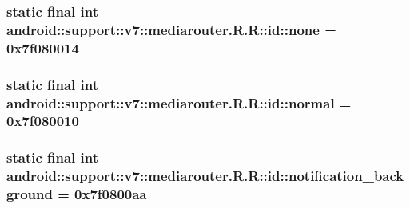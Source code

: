 \hypertarget{classandroid_1_1support_1_1v7_1_1mediarouter_1_1_r_1_1id_33740e6bf35598602d596823b53f16cf}{
\subsubsection[{none}]{\setlength{\rightskip}{0pt plus 5cm}static final int android::support::v7::mediarouter.R.R::id::none = 0x7f080014}}
\label{classandroid_1_1support_1_1v7_1_1mediarouter_1_1_r_1_1id_33740e6bf35598602d596823b53f16cf}


\hypertarget{classandroid_1_1support_1_1v7_1_1mediarouter_1_1_r_1_1id_6d53580addf511d547773e6c3be0c3aa}{
\subsubsection[{normal}]{\setlength{\rightskip}{0pt plus 5cm}static final int android::support::v7::mediarouter.R.R::id::normal = 0x7f080010}}
\label{classandroid_1_1support_1_1v7_1_1mediarouter_1_1_r_1_1id_6d53580addf511d547773e6c3be0c3aa}


\hypertarget{classandroid_1_1support_1_1v7_1_1mediarouter_1_1_r_1_1id_9939932f90d1bac36568988f4b4aadd9}{
\subsubsection[{notification\_\-background}]{\setlength{\rightskip}{0pt plus 5cm}static final int android::support::v7::mediarouter.R.R::id::notification\_\-background = 0x7f0800aa}}
\label{classandroid_1_1support_1_1v7_1_1mediarouter_1_1_r_1_1id_9939932f90d1bac36568988f4b4aadd9}


